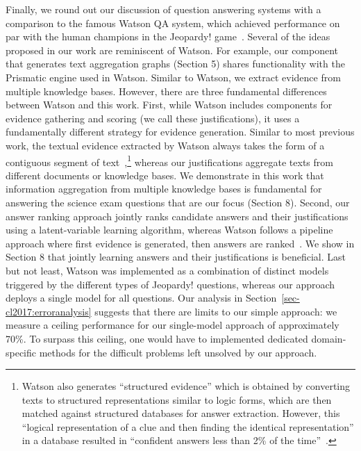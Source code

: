 Finally, we round out our discussion of question answering systems with a comparison to the famous Watson QA system, which achieved performance on par with the human champions in the Jeopardy! game~\cite{Ferucci:12}.
Several of the ideas proposed in our work are reminiscent of Watson. 
For example, our component that generates text aggregation graphs (Section 5) shares functionality with the Prismatic engine used in Watson. Similar to Watson, we extract evidence from multiple knowledge bases. However, there are three fundamental differences between Watson and this work. 
First, while Watson includes components for evidence gathering and scoring (we call these justifications), it uses a fundamentally different strategy for evidence generation. Similar to most previous work, the textual evidence extracted by Watson always takes the form of a contiguous segment of text~\cite{murdock2012textual},\footnote{Watson also generates ``structured evidence'' which is obtained by converting texts to structured representations similar to logic forms, which are then matched against structured databases for answer extraction. However, this ``logical representation of a clue and then finding the identical representation'' in a database resulted in ``confident answers less than 2\% of the time''~\cite{Ferucci:12}.} whereas our justifications aggregate texts from different documents or knowledge bases. We demonstrate in this work that information aggregation from multiple knowledge bases is fundamental for answering the science exam questions that are our focus (Section 8). 
Second, our answer ranking approach jointly ranks candidate answers and their justifications using a latent-variable learning algorithm, whereas Watson follows a pipeline approach where first evidence is generated, then answers are ranked~\cite{gondek2012framework}. We show in Section 8 that jointly learning answers and their justifications is beneficial. 
Last but not least, Watson was implemented as a combination of distinct models triggered by the different types of Jeopardy! questions, whereas our approach deploys a single model for all questions. Our analysis in Section~\ref{sec-cl2017:erroranalysis} suggests that there are limits to our simple approach: we measure a ceiling performance for our single-model approach of approximately 70\%. To surpass this ceiling, one would have to  implemented dedicated domain-specific methods for the difficult problems left unsolved by our approach. 

